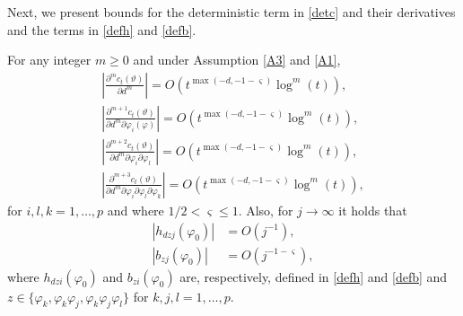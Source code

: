 {{Next, we present bounds for the deterministic term in \eqref{detc} and their derivatives and the terms in \eqref{defh} and \eqref{defb}. 
\begin{lemma}\label{r12}
For any integer $m \geq 0$ and under Assumption \ref{A3} and \ref{A1},
\begin{align}
      \left|\frac{\partial^{m} c_t(\vartheta)}{ \partial d^m } \right| = O(t^{\max(-d,-1-\varsigma)} \log^m(t)), \label{r12_1}\\
      \left|\frac{\partial^{m+1} c_t(\vartheta)}{ \partial d^m \partial \varphi_i(\varphi)} \right| = O(t^{\max(-d,-1-\varsigma)} \log^m(t)), \label{r12_2} \\
     \left|\frac{\partial^{m+2} c_t(\vartheta)}{ \partial d^m \partial \varphi_i \partial \varphi_l} \right| = O(t^{\max(-d,-1-\varsigma)} \log^m(t)), \label{r12_3}\\
      \left|\frac{\partial^{m+3} c_t(\vartheta)}{ \partial d^m \partial \varphi_i \partial \varphi_l \partial \varphi_k } \right| = O(t^{\max(-d,-1-\varsigma)} \log^m(t)), \label{r12_4} 
\end{align}
for $i,l,k = 1,\ldots,p$ and where $1/2 < \varsigma  \leq 1$. Also, for $j \rightarrow \infty$ it holds that  
\begin{align}
|h_{dzj}(\varphi_0)| &= O(j^{-1}), \label{hproof}\\
|b_{zj}(\varphi_0)| &=  O(j^{-1-\varsigma}), \label{bproof}   
\end{align}
where $h_{dzi}(\varphi_0)$ and $b_{zi}(\varphi_0)$ are, respectively, defined in \eqref{defh} and \eqref{defb} and $z \in \{ \varphi_k, \varphi_k \varphi_j, \varphi_k \varphi_j \varphi_l \}$ for $k,j,l = 1,\ldots,p$. 


\end{lemma}}}
